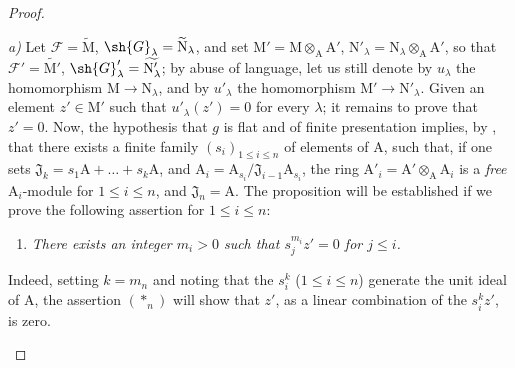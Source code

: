 \begin{proof}
\begin{enumerate}[label=(\roman*)]
  \emph{a)} Let $\mathscr{F}=\widetilde{\mathrm{M}}$, $\sh{G}_\lambda=\widetilde{\mathrm{N}}_\lambda$, and set $\mathrm{M}'=\mathrm{M}\otimes_\mathrm{A}\mathrm{A}'$, $\mathrm{N}'_\lambda=\mathrm{N}_\lambda\otimes_\mathrm{A}\mathrm{A}'$, so that $\mathscr{F}'=\widetilde{\mathrm{M}'}$, $\sh{G}'_\lambda=\widetilde{\mathrm{N}'_\lambda}$; by abuse of language, let us still denote by $u_\lambda$ the homomorphism $\mathrm{M}\to\mathrm{N}_\lambda$, and by $u'_\lambda$ the homomorphism $\mathrm{M}'\to\mathrm{N}'_\lambda$.
  Given an element $z'\in\mathrm{M}'$ such that $u'_\lambda(z')=0$ for every $\lambda$; it remains to prove that $z'=0$.
  Now, the hypothesis that $g$ is flat and of finite presentation implies, by , that there exists a finite family $(s_i)_{1\leq i\leq n}$ of elements of $\mathrm{A}$, such that, if one sets $\mathfrak{J}_k=s_1\mathrm{A}+\ldots+s_k\mathrm{A}$, and $\mathrm{A}_i=\mathrm{A}_{s_i}/\mathfrak{J}_{i-1}\mathrm{A}_{s_i}$, the ring $\mathrm{A}'_i=\mathrm{A}'\otimes_\mathrm{A}\mathrm{A}_i$ is a \emph{free} $\mathrm{A}_i$-module for $1\leq i\leq n$, and $\mathfrak{J}_n=\mathrm{A}$.
  The proposition will be established if we prove the following assertion for $1\leq i\leq n$:
  \begin{enumerate}[label=$(*_i)$]
    \item \emph{There exists an integer $m_i>0$ such that $s_j^{m_i}z'=0$ for $j\leq i$.}
  \end{enumerate}
  Indeed, setting $k=m_n$ and noting that the $s_i^k$ ($1\leq i\leq n$) generate the unit ideal of $\mathrm{A}$, the assertion $(*_n)$ will show that $z'$, as a linear combination of the $s_i^k z'$, is zero.


\end{enumerate}
\end{proof}
